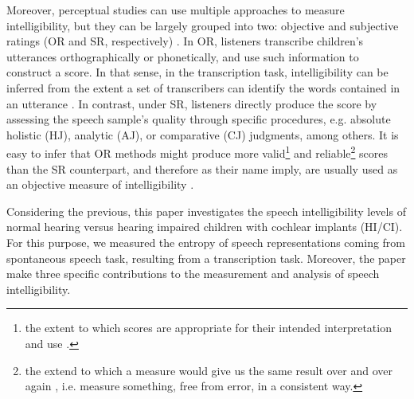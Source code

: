 Moreover, perceptual studies can use multiple approaches to measure intelligibility, but they can be largely grouped into two: objective and subjective ratings (OR and SR, respectively) \citep{Hustad_et_al_2020}. In OR, listeners transcribe children's utterances orthographically or phonetically, and use such information to construct a score. In that sense, in the transcription task, intelligibility can be inferred from the extent a set of transcribers can identify the words contained in an utterance \cite{Boonen_et_al_2021}. In contrast, under SR, listeners directly produce the score by assessing the speech sample's quality through specific procedures, e.g. absolute holistic (HJ), analytic (AJ), or comparative (CJ) judgments, among others. It is easy to infer that OR methods might produce more valid\footnote{the extent to which scores are appropriate for their intended interpretation and use \citep{Lesterhuis_2018, Trochim_2022}.} and reliable\footnote{the extend to which a measure would give us the same result over and over again \citep{Trochim_2022}, i.e. measure something, free from error, in a consistent way.} scores than the SR counterpart, and therefore as their name imply, are usually used as an objective measure of intelligibility \citep{Boonen_et_al_2021, Faes_et_al_2021}.

Considering the previous, this paper investigates the speech intelligibility levels of normal hearing versus hearing impaired children with cochlear implants (HI/CI). For this purpose, we measured the entropy of speech representations coming from spontaneous speech task, resulting from a transcription task. Moreover, the paper make three specific contributions to the measurement and analysis of speech intelligibility. 

